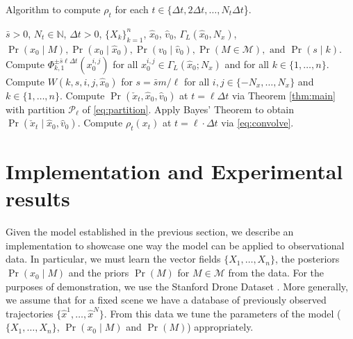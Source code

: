 \documentclass[letterpaper,10pt,conference]{ieeetran}
\begin{document}
\begin{algorithm}[t]
		  \caption{Algorithm to compute  $\rho_t$ for each $t \in  \{\Delta t, 2 \Delta t, \dots, N_t \Delta t$\}.}
		  \label{alg:1}
		  \begin{algorithmic}[1]
		    \Require $\bar{s} > 0$, $N_t \in \mathbb{N}$, $\Delta t > 0$,  $ \{ X_k \}_{k=1}^{n}$, $\hat{x}_0$, $\hat{v}_0$, $\Gamma_L( \hat{x}_0, N_x)$, $\Pr(x_0 \mid M), \Pr(x_0 \mid \hat{x}_0), \Pr(v_0 \mid \hat{v}_0 ), \Pr(M \in \mathcal{M}), \text{ and } \Pr(s \mid k)$.
		    \State Compute $\Phi_{k,1}^{ \pm \bar{s} \ell \Delta t}( x_0^{i,j} )$ for all $x_0^{i,j} \in \Gamma_L( \hat{x}_0 ; N_x)$ and \hspace*{12pt} for all $k \in  \{1,\dots, n\}$.
		    \State Compute $W(k,s,i,j,\hat{x}_0)$ for $s = \bar{s} m / \ell$ for all \hspace*{28pt} $i,j\in \{-N_x,\dots, N_x\}$ and $k\in \{1,\dots,n\}$.
		    \EndFor  
		    \State Compute $\Pr(\check{x}_t, \hat{x}_0, \hat{v}_0)$ at $t=\ell \Delta t$ via Theorem \ref{thm:main} 
		    \hspace*{12pt} with partition $\mathcal{P}_\ell$ of \eqref{eq:partition}.\label{alg1:step2}
		    \State Apply Bayes' Theorem to obtain $\Pr(\check{x}_t \mid \hat{x}_0, \hat{v}_0)$.
		    \State Compute $\rho_t(x_t)$ at $t= \ell \cdot \Delta t$ via \eqref{eq:convolve}.
		    \EndFor
		  \end{algorithmic}
\end{algorithm}

  
\section{Implementation and Experimental results} \label{sec:implementation}
  Given the model established in the previous section, we describe an implementation to showcase one way the model can be applied to observational data.
  In particular, we must learn the vector fields $\{X_1, \dots, X_n\}$, the posteriors $\Pr( x_0 \mid M)$ and the priors $\Pr(M)$ for $M \in \mathcal{M}$ from the data.
  For the purposes of demonstration, we use the Stanford Drone Dataset \cite{Robicquet2016}.
  More generally, we assume that for a fixed scene we have a database of previously observed trajectories $\{ \hat{x}^1, \dots, \hat{x}^N\}$.
  From this data we tune the parameters of the model ($\{X_1, \dots, X_n\}$, $\Pr( x_0 \mid M)$ and $\Pr(M)$)  appropriately.
  
\end{document}
